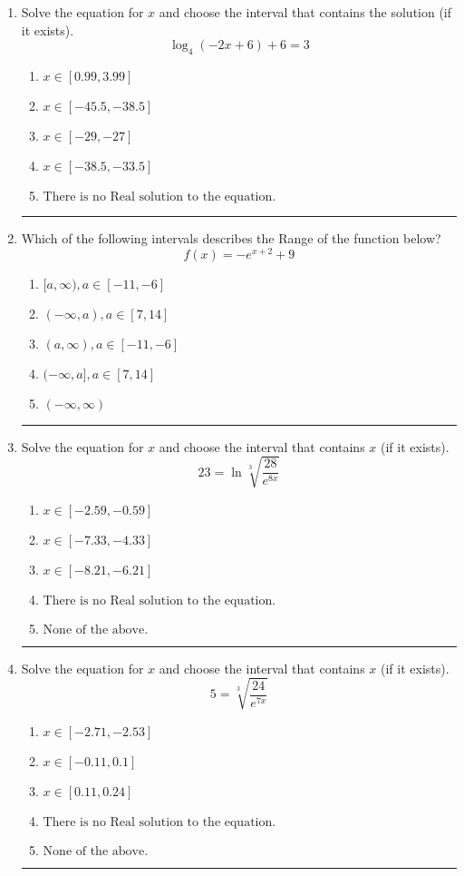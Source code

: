 \documentclass[14pt]{extbook}
\newcommand{\litem}[1]{\item#1\hspace*{-1cm}\rule{\textwidth}{0.4pt}}
\begin{document}
\begin{enumerate}
{\begin{enumerate}[label=\Alph*.]
\end{enumerate} }
\litem{
Solve the equation for $x$ and choose the interval that contains the solution (if it exists).\[ \log_{4}{(-2x+6)}+6 = 3 \]\begin{enumerate}[label=\Alph*.]
\item \( x \in [0.99, 3.99] \)
\item \( x \in [-45.5, -38.5] \)
\item \( x \in [-29, -27] \)
\item \( x \in [-38.5, -33.5] \)
\item \( \text{There is no Real solution to the equation.} \)

\end{enumerate} }
\litem{
Which of the following intervals describes the Range of the function below?\[ f(x) = -e^{x+2}+9 \]\begin{enumerate}[label=\Alph*.]
\item \( [a, \infty), a \in [-11, -6] \)
\item \( (-\infty, a), a \in [7, 14] \)
\item \( (a, \infty), a \in [-11, -6] \)
\item \( (-\infty, a], a \in [7, 14] \)
\item \( (-\infty, \infty) \)

\end{enumerate} }
\litem{
 Solve the equation for $x$ and choose the interval that contains $x$ (if it exists).\[  23 = \ln{\sqrt[3]{\frac{28}{e^{8x}}}} \]\begin{enumerate}[label=\Alph*.]
\item \( x \in [-2.59, -0.59] \)
\item \( x \in [-7.33, -4.33] \)
\item \( x \in [-8.21, -6.21] \)
\item \( \text{There is no Real solution to the equation.} \)
\item \( \text{None of the above.} \)

\end{enumerate} }
\litem{
 Solve the equation for $x$ and choose the interval that contains $x$ (if it exists).\[  5 = \sqrt[3]{\frac{24}{e^{7x}}} \]\begin{enumerate}[label=\Alph*.]
\item \( x \in [-2.71, -2.53] \)
\item \( x \in [-0.11, 0.1] \)
\item \( x \in [0.11, 0.24] \)
\item \( \text{There is no Real solution to the equation.} \)
\item \( \text{None of the above.} \)


\end{enumerate}}
\end{enumerate}
\end{document}
